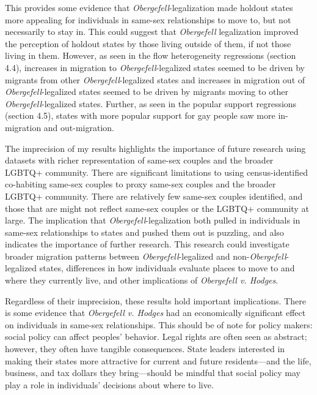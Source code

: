 \documentclass[12pt,letterpaper]{article}
\begin{document}
This provides some evidence that \textit{Obergefell}-legalization made holdout states more appealing for individuals in same-sex relationships to move to, but not necessarily to stay in. This could suggest that \textit{Obergefell} legalization improved the perception of holdout states by those living outside of them, if not those living in them. However, as seen in the flow heterogeneity regressions (section 4.4), increases in migration to \textit{Obergefell}-legalized states seemed to be driven by migrants from other \textit{Obergefell}-legalized states and increases in migration out of \textit{Obergefell}-legalized states seemed to be driven by migrants moving to other \textit{Obergefell}-legalized states. Further, as seen in the popular support regressions (section 4.5), states with more popular support for gay people saw more in-migration and out-migration.

The imprecision of my results highlights the importance of future research using datasets with richer representation of same-sex couples and the broader LGBTQ+ community. There are significant limitations to using census-identified co-habiting same-sex couples to proxy same-sex couples and the broader LGBTQ+ community. There are relatively few same-sex couples identified, and those that are might not reflect same-sex couples or the LGBTQ+ community at large. The implication that \textit{Obergefell}-legalization both pulled in individuals in same-sex relationships to states and pushed them out is puzzling, and also indicates the importance of further research. This research could investigate broader migration patterns between \textit{Obergefell}-legalized and non-\textit{Obergefell}-legalized states, differences in how individuals evaluate places to move to and where they currently live, and other implications of \textit{Obergefell v. Hodges}. 

Regardless of their imprecision, these results hold important implications. There is some evidence that \textit{Obergefell v. Hodges} had an economically significant effect on individuals in same-sex relationships. This should be of note for policy makers: social policy can affect peoples' behavior. Legal rights are often seen as abstract; however, they often have tangible consequences. State leaders interested in making their states more attractive for current and future residents---and the life, business, and tax dollars they bring---should be mindful that social policy may play a role in individuals' decisions about where to live. 
\end{document}
